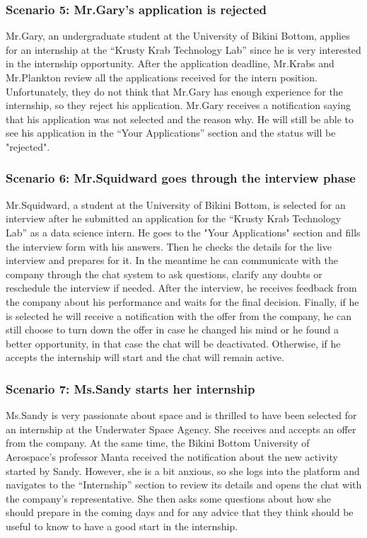 \subsubsection{Scenario 5: Mr.Gary's application is rejected}\label{subsubsec:scenario_5}
Mr.Gary, an undergraduate student at the University of Bikini Bottom, applies for an internship at the ``Krusty Krab Technology Lab'' since he is very 
interested in the internship opportunity. After the application deadline, Mr.Krabs and Mr.Plankton review all the applications received for the intern 
position. Unfortunately, they do not think that Mr.Gary has enough experience for the internship, so they reject his application. Mr.Gary receives a 
notification saying that his application was not selected and the reason why. He will still be able to see his application in the ``Your Applications'' 
section and the status will be "rejected".

\subsubsection{Scenario 6: Mr.Squidward goes through the interview phase}\label{subsubsec:scenario_6}
Mr.Squidward, a student at the University of Bikini Bottom, is selected for an interview after he submitted an application for the ``Krusty Krab Technology 
Lab'' as a data science intern. He goes to the "Your Applications" section and fills the interview form with his answers. Then he checks the details for the 
live interview and prepares for it. In the meantime he can communicate with the company through the chat system to ask questions, clarify any doubts or 
reschedule the interview if needed. After the interview, he receives feedback from the company about his performance and waits for the final decision. 
Finally, if he is selected he will receive a notification with the offer from the company, he can still choose to turn down the offer in case he changed 
his mind or he found a better opportunity, in that case the chat will be deactivated. Otherwise, if he accepts the internship will start and the chat 
will remain active.

\subsubsection{Scenario 7: Ms.Sandy starts her internship}\label{subsubsec:scenario_7}
Ms.Sandy is very passionate about space and is thrilled to have been selected for an internship at the Underwater Space Agency. She receives 
and accepts an offer from the company. At the same time, the Bikini Bottom University of Aerospace's professor Manta received the notification
about the new activity started by Sandy. However, she is a bit anxious, so she logs into the platform and navigates to the ``Internship'' 
section to review its details and opens the chat with the company's representative. She then asks some questions about how she should prepare in the 
coming days and for any advice that they think should be useful to know to have a good start in the internship.

